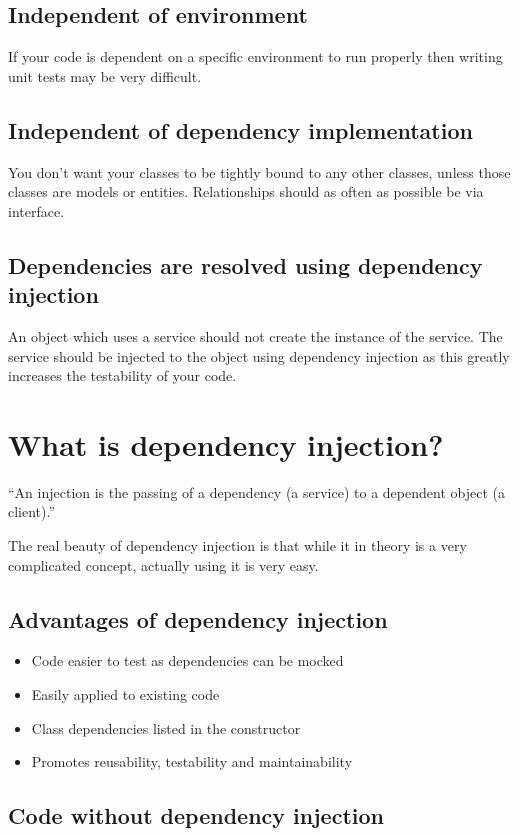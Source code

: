 \documentclass[12pt]{article}
\begin{document}
\subsection{Independent of environment}
If your code is dependent on a specific environment to run properly then writing unit tests may be very difficult.

\subsection{Independent of dependency implementation}
You don't want your classes to be tightly bound to any other classes, unless those classes are models or entities. Relationships should as often as possible be via interface.

\subsection{Dependencies are resolved using dependency injection}
An object which uses a service should not create the instance of the service. The service should be injected to the object using dependency injection as this greatly increases the testability of your code.

\section{What is dependency injection?}
{\large ``An injection is the passing of a dependency (a service) to a dependent object (a client).''}
\vskip5mm
\hspace*{}

The real beauty of dependency injection is that while it in theory is a very complicated concept, actually using it is very easy.

\subsection{Advantages of dependency injection}
\begin{itemize}
	\item Code easier to test as dependencies can be mocked
	\item Easily applied to existing code
	\item Class dependencies listed in the constructor
	\item Promotes reusability, testability and maintainability
\end{itemize}

\subsection{Code without dependency injection}

\end{document}
